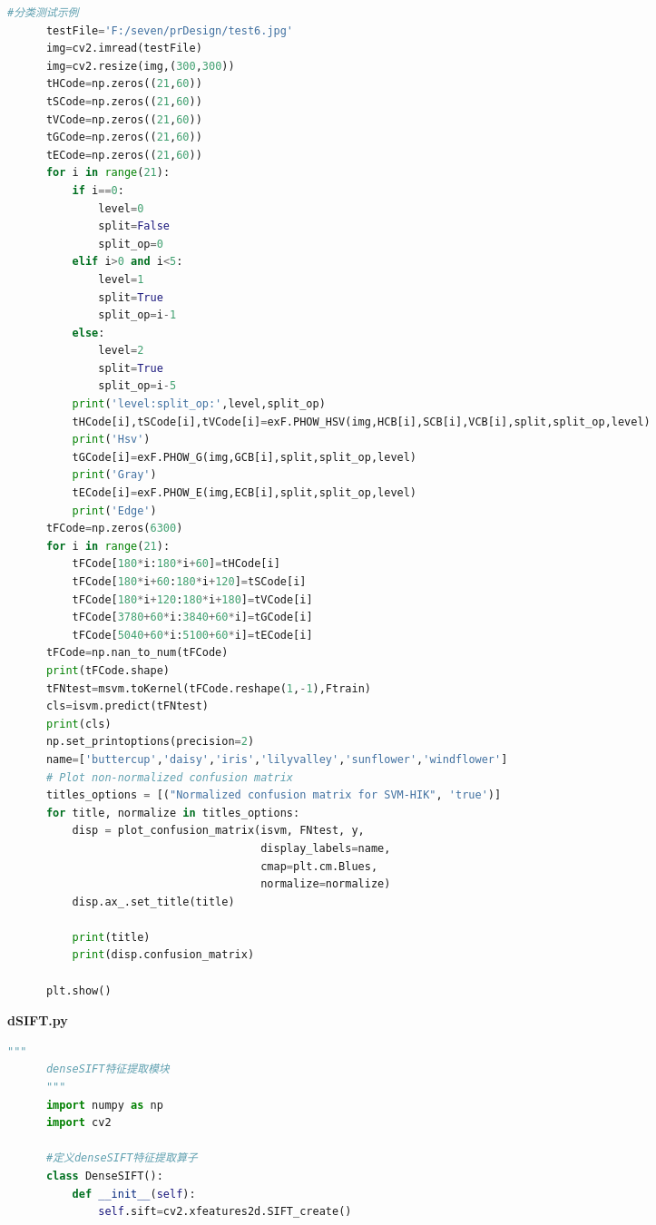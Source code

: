 \documentclass[supercite]{HustGraduPaper}
\begin{document}
\begin{sloppypar}
\begin{appendices}
\begin{spacing}{1.25}
\begin{lstlisting}[language=python]
      #分类测试示例
      testFile='F:/seven/prDesign/test6.jpg'
      img=cv2.imread(testFile)
      img=cv2.resize(img,(300,300))
      tHCode=np.zeros((21,60))
      tSCode=np.zeros((21,60))
      tVCode=np.zeros((21,60))
      tGCode=np.zeros((21,60))
      tECode=np.zeros((21,60))
      for i in range(21):
          if i==0:
              level=0
              split=False
              split_op=0
          elif i>0 and i<5:
              level=1
              split=True
              split_op=i-1
          else:
              level=2
              split=True
              split_op=i-5
          print('level:split_op:',level,split_op)
          tHCode[i],tSCode[i],tVCode[i]=exF.PHOW_HSV(img,HCB[i],SCB[i],VCB[i],split,split_op,level)
          print('Hsv')
          tGCode[i]=exF.PHOW_G(img,GCB[i],split,split_op,level)
          print('Gray')
          tECode[i]=exF.PHOW_E(img,ECB[i],split,split_op,level)
          print('Edge')
      tFCode=np.zeros(6300)
      for i in range(21):
          tFCode[180*i:180*i+60]=tHCode[i]
          tFCode[180*i+60:180*i+120]=tSCode[i]
          tFCode[180*i+120:180*i+180]=tVCode[i]
          tFCode[3780+60*i:3840+60*i]=tGCode[i]
          tFCode[5040+60*i:5100+60*i]=tECode[i]
      tFCode=np.nan_to_num(tFCode)
      print(tFCode.shape)
      tFNtest=msvm.toKernel(tFCode.reshape(1,-1),Ftrain)
      cls=isvm.predict(tFNtest)
      print(cls)
      np.set_printoptions(precision=2)
      name=['buttercup','daisy','iris','lilyvalley','sunflower','windflower']
      # Plot non-normalized confusion matrix
      titles_options = [("Normalized confusion matrix for SVM-HIK", 'true')]
      for title, normalize in titles_options:
          disp = plot_confusion_matrix(isvm, FNtest, y,
                                       display_labels=name,
                                       cmap=plt.cm.Blues,
                                       normalize=normalize)
          disp.ax_.set_title(title)
      
          print(title)
          print(disp.confusion_matrix)
      
      plt.show()
    \end{lstlisting}
  \end{spacing}
  \textbf{dSIFT.py}
    \begin{spacing}{1.25}
    \begin{lstlisting}[language=python]
      """
      denseSIFT特征提取模块
      """
      import numpy as np
      import cv2
      
      #定义denseSIFT特征提取算子
      class DenseSIFT():
          def __init__(self):
              self.sift=cv2.xfeatures2d.SIFT_create()
          

\end{lstlisting}
\end{spacing}
\end{appendices}
\end{sloppypar}
\end{document}

